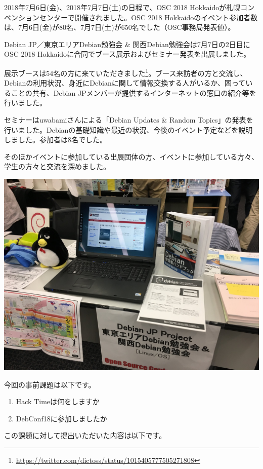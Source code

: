 \documentclass[mingoth,a4paper]{jsarticle}
\begin{document}
2018年7月6日(金)、2018年7月7日(土)の日程で、OSC 2018 Hokkaidoが札幌コンベンションセンターで開催されました。OSC 2018 Hokkaidoのイベント参加者数は、7月6日(金)が80名、7月7日(土)が650名でした（OSC事務局発表値）。

Debian JP／東京エリアDebian勉強会 \& 関西Debian勉強会は7月7日の2日目にOSC 2018 Hokkaidoに合同でブース展示およびセミナー発表を出展しました。

展示ブースは54名の方に来ていただきました\footnote{\url{https://twitter.com/dictoss/status/1015405777505271808}}。ブース来訪者の方と交流し、Debianの利用状況、身近にDebianに関して情報交換する人がいるか、困っていることの共有、Debian JPメンバーが提供するインターネットの窓口の紹介等を行いました。

セミナーはuwabamiさんによる「Debian Updates \& Random Topics」の発表を行いました。Debianの基礎知識や最近の状況、今後のイベント予定などを説明しました。参加者は8名でした。

そのほかイベントに参加している出展団体の方、イベントに参加している方々、学生の方々と交流を深めました。

\begin{center}
  \includegraphics[width=0.5\hsize]{image201808/osc2018do_booth.jpg}
\end{center}


今回の事前課題は以下です。

\begin{enumerate}
\item Hack Timeは何をしますか
\item DebConf18に参加しましたか
\end{enumerate}

この課題に対して提出いただいた内容は以下です。

\begin{multicols}{2}
{\small

}
\end{multicols}

%
%
%
%
\end{document}
